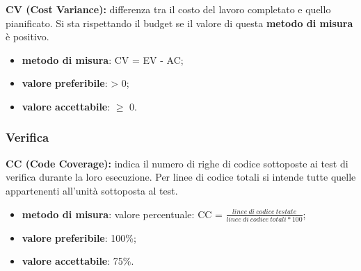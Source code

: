 \textbf{CV (Cost Variance):} differenza tra il costo del lavoro completato e quello pianificato. Si sta rispettando il budget se il valore di questa \textbf{metodo di misura} 
è positivo.
\begin{itemize}
    \item \textbf{metodo di misura}: CV = EV - AC;
    \item \textbf{valore preferibile}: > 0;
    \item \textbf{valore accettabile}: $\geq$ 0.
\end{itemize}
\subsubsection{Verifica}
\textbf{CC (Code Coverage):} indica il numero di righe di codice sottoposte ai test di verifica durante la loro esecuzione. Per linee di codice totali 
si intende tutte quelle appartenenti all'unità sottoposta al test.
\begin{itemize}
    \item \textbf{metodo di misura}: valore percentuale: CC = $\frac{linee \ di \ codice \ testate}{linee \ di \ codice \ totali * 100}$;
    \item \textbf{valore preferibile}: 100\%;
    \item \textbf{valore accettabile}: 75\%.
\end{itemize}
